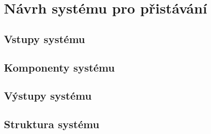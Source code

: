 \chapter{Návrh systému pro přistávání}
  \section{Vstupy systému}
  \section{Komponenty systému}
  \section{Výstupy systému}
  \section{Struktura systému}